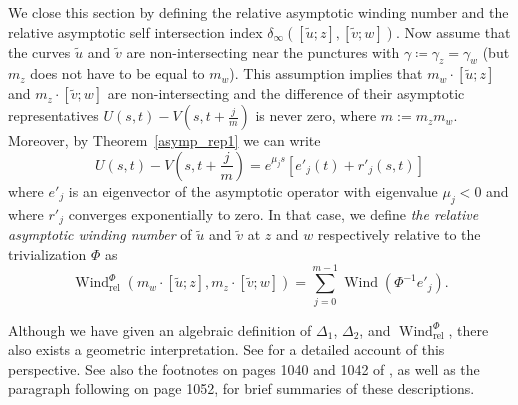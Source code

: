 \documentclass[11pt, a4paper]{amsart}
\DeclareMathOperator{\wind}{Wind}
\begin{document}
We close this section by defining the relative asymptotic winding number and the relative asymptotic self intersection index $\delta_{\infty}([\tilde{u}; z], [\tilde{v}; w])$. Now assume that the curves $\tilde{u}$ and $\tilde{v}$ are non-intersecting near the punctures with $\gamma \coloneqq \gamma_z=\gamma_w$ (but $m_z$ does not have to be equal to $m_w$). This assumption implies that $m_w\cdot[\tilde{u}; z]$ and $m_z\cdot[\tilde{v}; w]$ are non-intersecting and the difference of their asymptotic representatives $U(s, t)- V\left(s, t + \frac{j}{m}\right)$ is never zero, where $m:=m_zm_w$. Moreover, by Theorem~\ref{asymp_rep1} we can write
$$U(s, t) -V\left(s, t + \frac{j}{m}\right) = e^{\mu_j s} [e'_j (t) + r'_j (s, t)]$$
where $e'_j$ is an eigenvector of the asymptotic operator with eigenvalue $\mu_j < 0$ and where $r'_j$ converges exponentially to zero. In that case, we define \textit{the relative asymptotic winding number} of $\tilde{u}$ and $\tilde{v}$ at $z$ and $w$ respectively relative to the trivialization $\Phi$ as
$$\wind^{\Phi}_{\mathrm{rel}} \left(m_w\cdot[\tilde{u}; z], m_z\cdot[\tilde{v}; w]\right) =
\sum_{j=0}^{m-1} \wind\left(\Phi^{-1} e'_j \right).$$

\begin{remark}
Although we have given an algebraic definition of $\Delta_1$, $\Delta_2$, and $\wind^{\Phi}_{\mathrm{rel}}$, there also exists a geometric interpretation. See \cite[Section~3.2]{Siefinter2009} for a detailed account of this perspective. See also the footnotes on pages 1040 and 1042 of \cite{Siefinter2009}, as well as the paragraph following \cite[Equation~3.29]{Siefinter2009} on page 1052, for brief summaries of these descriptions.
\end{remark}
\end{document}
